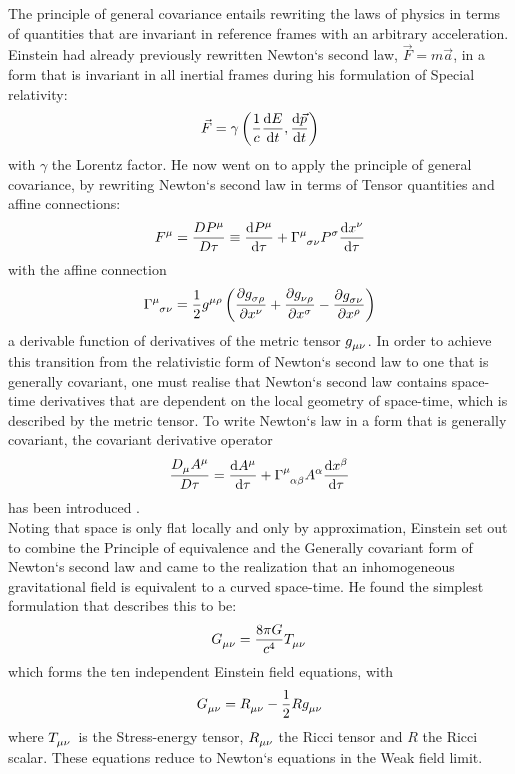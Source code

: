 \documentclass[a4paper, 11pt]{FSKH_623_Report}
\numberwithin{equation}{section}
\begin{document}
The principle of general covariance entails rewriting the laws of physics in terms of quantities that are invariant in reference frames with an arbitrary acceleration.\citep{ITC} Einstein had already previously rewritten Newton`s second law, $\vec{F}=m\vec{a}$, in a form that is invariant in all inertial frames during his formulation of Special relativity: $$\vec{F}=\gamma\left(\frac{1}{c}\dv{E}{t},\dv{\vec{p}}{t}\right)$$with $\gamma$ the Lorentz factor. He now went on to apply the principle of general covariance, by rewriting Newton`s second law in terms of Tensor quantities and affine connections: $$\tensor{F}{^\mu}=\frac{D\tensor{P}{^\mu}}{D\tau}\equiv\dv{\tensor{P}{^\mu}}{\tau}+\tensor{\Gamma}{^\mu_{\sigma\nu}}\tensor{P}{^\sigma}\dv{\tensor{x}{^\nu}}{\tau}$$ with the affine connection $$\tensor{\Gamma}{^\mu_{\sigma\nu}}=\frac{1}{2}\tensor{g}{^{\mu\rho}}\left(\pdv{\tensor{g}{_{\sigma\rho}}}{x^\nu}+\pdv{\tensor{g}{_{\nu\rho}}}{x^\sigma}-\pdv{\tensor{g}{_{\sigma\nu}}}{x^\rho}\right)$$ a derivable function of derivatives of the metric tensor $\tensor{g}{_{\mu\nu}}$.\citep{ITC} In order to achieve this transition from the relativistic form of Newton`s second law to one that is generally covariant, one must realise that Newton`s second law contains space-time derivatives that are dependent on the local geometry of space-time, which is described by the metric tensor. To write Newton`s law in a form that is generally covariant, the covariant derivative operator $$\frac{\tensor{D}{_\mu}\tensor{A}{^\mu}}{D\tau}=\dv{\tensor{A}{^\mu}}{\tau}+\tensor{\Gamma}{^\mu_{\alpha\beta}}\tensor{A}{^\alpha}\dv{\tensor{x}{^{\beta}}}{\tau}$$ has been introduced \citep{GRFD}. \\ 
Noting that space is only flat locally and only by approximation, Einstein set out to combine the Principle of equivalence and the Generally covariant form of Newton`s second law and came to the realization that an inhomogeneous gravitational field is equivalent to a curved space-time. He found the simplest formulation that describes this to be:
$$\tensor{G}{_{\mu\nu}}=\frac{8\pi G}{c^{4}}\tensor{T}{_{\mu\nu}}$$
which forms the ten independent Einstein field equations, with 
$$\tensor{G}{_{\mu\nu}}=\tensor{R}{_{\mu\nu}}-\frac{1}{2}R\tensor{g}{_{\mu\nu}}$$ where $\tensor{T}{_{\mu\nu}}$ is the Stress-energy tensor, $\tensor{R}{_{\mu\nu}}$ the Ricci tensor and $R$ the Ricci scalar\citep{ITC}. These equations reduce to Newton`s equations in the Weak field limit.
\end{document}
